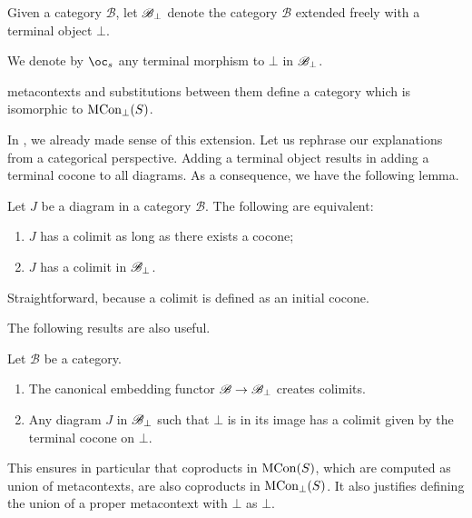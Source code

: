 \begin{definition}
Given a category $\mathscr{B}$, let $\mathscr{B}_{\bot}$ denote the category
$\mathscr{B}$ extended freely with a terminal object $\bot$.
\end{definition}
\begin{notation}
We denote by $\bang_{s}$ any terminal morphism to $\bot$ in $\mathscr{B}_{\bot}$.
\end{notation}
\begin{lemma}
metacontexts and substitutions between them define a category which
is isomorphic to $\mathrm{MCon_{\bot}}(S)$.
\end{lemma}
In , we already made sense of this extension.
Let us rephrase our explanations from a categorical perspective. Adding
a terminal object results in adding a terminal cocone to all diagrams.
As a consequence, we have the following lemma.
\begin{lemma}
Let $J$ be a diagram in a category $\mathscr{B}$. The following
are equivalent:
\begin{enumerate}
\item $J$ has a colimit as long as there exists a cocone;
\item $J$ has a colimit in $\mathscr{B}_{\bot}$.
\end{enumerate}
\end{lemma}
\begin{longproof}
Straightforward, because a colimit is defined as an initial cocone.
\end{longproof}
%
The following results are also useful.
\begin{lemma}
Let $\mathscr{B}$ be a category.
\begin{enumerate}[label=(\roman{enumi}), ref=\thelemma.(\roman{enumi})]
\item \label{lem:bot-creates}The canonical embedding functor $\mathscr{B}\rightarrow\mathscr{B}_{\bot}$
creates colimits. 
\item \label{lem:diag-bot}Any diagram $J$ in $\mathscr{B}_{\bot}$ such that $\bot$
is in its image has a colimit given by the terminal cocone on $\bot$.
\end{enumerate}
\end{lemma}
This ensures in particular that coproducts in $\mathrm{MCon}(S)$, which are
computed as union of metacontexts, are also coproducts in $\mathrm{MCon_{\bot}}(S)$.
It also justifies defining the union of a proper metacontext with
$\bot$ as $\bot$.

